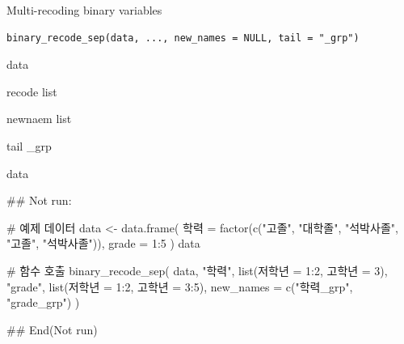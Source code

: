 \documentclass[a4paper]{book}
\begin{document}
%
\begin{Description}
Multi-recoding binary variables
\end{Description}
%
\begin{Usage}
\begin{verbatim}
binary_recode_sep(data, ..., new_names = NULL, tail = "_grp")
\end{verbatim}
\end{Usage}
%
\begin{Arguments}
\begin{ldescription}
\item[\code{data}] data

\item[\code{...}] recode list

\item[\code{new\_names}] newnaem list

\item[\code{tail}] tail \_grp
\end{ldescription}
\end{Arguments}
%
\begin{Value}
data
\end{Value}
%
\begin{Examples}
\begin{ExampleCode}


\#\# Not run: 




# 예제 데이터
data <- data.frame(
  학력 = factor(c("고졸", "대학졸", "석박사졸", "고졸", "석박사졸")),
  grade = 1:5
)
data


# 함수 호출
binary_recode_sep(  data,
                    "학력", list(저학년 = 1:2, 고학년 = 3),
                    "grade", list(저학년 = 1:2, 고학년 = 3:5),
                    new_names = c("학력_grp", "grade_grp")
)





## End(Not run)
\end{ExampleCode}
\end{Examples}
\end{document}
